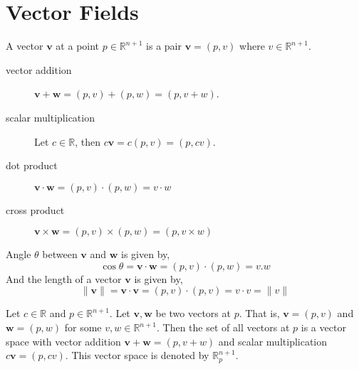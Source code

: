 \section{Vector Fields}
\begin{definition}
	A vector $\mathbf{v}$ at a point $p \in \mathbb{R}^{n+1}$ is a pair $\mathbf{v} = (p,v)$ where $v \in \mathbb{R}^{n+1}$.
\end{definition}
\begin{description}
	\item[vector addition] $\mathbf{v} + \mathbf{w} = (p,v) + (p,w) = (p,v+w)$.
	\item[scalar multiplication] Let $c \in \mathbb{R}$, then $c \mathbf{v} =  c(p,v) = (p,cv)$.
	\item[dot product] $\mathbf{v}\cdot \mathbf{w} = (p,v)\cdot(p,w) = v \cdot w$
	\item[cross product] $\mathbf{v}\times \mathbf{w} = (p,v)\times(p,w) = (p,v \times w)$
\end{description}
\begin{remark}
	Angle $\theta$ between $\mathbf{v}$ and $\mathbf{w}$ is given by,
	\begin{equation}
		\cos \theta = \mathbf{v}\cdot\mathbf{w} = (p,v)\cdot(p,w) = v.w
	\end{equation}
	And the length of a vector $\mathbf{v}$ is given by,
	\begin{equation}
		\|\mathbf{v}\| = \mathbf{v}\cdot\mathbf{v} = (p,v)\cdot(p,v) = v\cdot v = \| v \|
	\end{equation}
\end{remark}

\begin{remark}
	Let $c \in \mathbb{R}$ and $p \in \mathbb{R}^{n+1}$.
	Let $\mathbf{v}, \mathbf{w}$ be two vectors at $p$.
	That is, $\mathbf{v} = (p,v)$ and $\mathbf{w} = (p,w)$ for some $v,w \in \mathbb{R}^{n+1}$.
	Then the set of all vectors at $p$ is a vector space with vector addition $\mathbf{v}+\mathbf{w} = (p,v+w)$ and scalar multiplication $c\mathbf{v} = (p,cv)$.
	This vector space is denoted by $\mathbb{R}_p^{n+1}$.
\end{remark}

